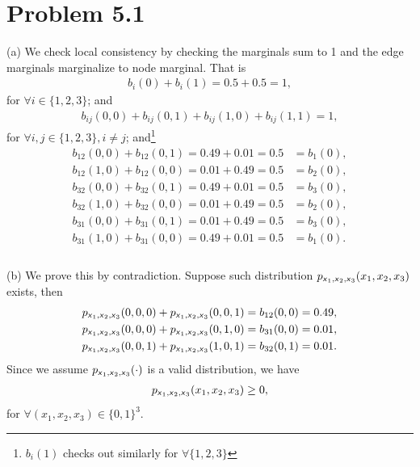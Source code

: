 \documentclass{article}
\newcommand{\s}[1]{\textsf{\textit{#1}}}
\newcommand{\qeds}{\hfill\qedsymbol}
\begin{document}
\section*{Problem 5.1}
%
(a) We check local consistency by checking the marginals sum to 1 and the
edge marginals marginalize to node marginal. That is
%
\begin{align*}
	b_i(0) + b_i(1) = 0.5 + 0.5 = 1,
\end{align*}
%
for $\forall i \in \{1, 2, 3\}$; and
\begin{align*}
	b_{ij}(0,0) + b_{ij}(0,1) + b_{ij}(1,0) + b_{ij}(1,1) = 1,
\end{align*}
%
for $\forall i, j \in \{1, 2, 3\}, i \neq j$;
and\footnote{$b_i(1)$ checks out similarly for $\forall \{1,2,3\}$}
%
\begin{align*}
	b_{12}(0, 0) + b_{12}(0, 1) = 0.49 + 0.01 = 0.5 &= b_1(0),\\
	b_{12}(1, 0) + b_{12}(0, 0) = 0.01 + 0.49 = 0.5 &= b_2(0),\\
	b_{32}(0, 0) + b_{32}(0, 1) = 0.49 + 0.01 = 0.5 &= b_3(0),\\
	b_{32}(1, 0) + b_{32}(0, 0) = 0.01 + 0.49 = 0.5 &= b_2(0),\\
	b_{31}(0, 0) + b_{31}(0, 1) = 0.01 + 0.49 = 0.5 &= b_3(0),\\
	b_{31}(1, 0) + b_{31}(0, 0) = 0.49 + 0.01 = 0.5 &= b_1(0).\\
\end{align*} \qeds
%
\\

\noindent
(b) We prove this by contradiction. Suppose such distribution
$p_{\s{x}_1, \s{x}_2, \s{x}_3}(x_1, x_2, x_3)$ exists, then
\begin{align}
	&p_{\s{x}_1, \s{x}_2, \s{x}_3}(0, 0, 0) + p_{\s{x}_1, \s{x}_2, \s{x}_3}(0, 0, 1) = b_{12}(0, 0) = 0.49, \label{51b1}\\
	&p_{\s{x}_1, \s{x}_2, \s{x}_3}(0, 0, 0) + p_{\s{x}_1, \s{x}_2, \s{x}_3}(0, 1, 0) = b_{31}(0, 0) = 0.01, \label{51b2}\\
	&p_{\s{x}_1, \s{x}_2, \s{x}_3}(0, 0, 1) + p_{\s{x}_1, \s{x}_2, \s{x}_3}(1, 0, 1) = b_{32}(0, 1) = 0.01. \label{51b3}
\end{align}
%
Since we assume $p_{\s{x}_1, \s{x}_2, \s{x}_3}(\cdot)$ is a valid distribution, we have
\begin{align*}
	p_{\s{x}_1, \s{x}_2, \s{x}_3}(x_1, x_2, x_3) \geq 0,
\end{align*}
for $\forall (x_1, x_2, x_3) \in \{0, 1\}^3$.
\end{document}

